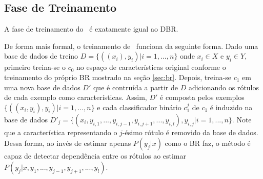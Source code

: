   
  
  
  

 
 
 \subsection{Fase de Treinamento}
  A fase de treinamento do \MRLMa~é exatamente igual ao DBR.
   
  
  
  De forma mais formal, o treinamento de \MRLM~funciona da seguinte forma.
  Dado uma base de dados de treino $D=\{((x_i),y_i)|i=1,...,n\}$ onde $x_i \in X$ e $y_i \in Y$,
  primeiro treina-se o $c_0$
  no espaço de características original conforme o treinamento do próprio BR mostrado na seção \ref{sec:br}.
  Depois, treina-se $c_1$ em uma nova base de dados $D'$ que é contruída a partir de $D$ adicionando os rótulos de cada
  exemplo como características. Assim, $D'$ é composta pelos exemplos $\{((x_i,y_i),y_i) |i=1,...,n\}$ e
  cada classificador binário $c_1^j$ de $c_1$ é induzido na base de dados $D'_j=\{(x_i,y_{i,1},...,y_{i,j-1},y_{i,j+1},...,y_{i,l}),y_{i,j} | i=1,...,n\}$.
  Note que a característica representando o $j$-ésimo rótulo é removido da base de dados.
  Dessa forma, ao invés de estimar apenas $P(y_j|x)$ como o BR faz, o método é capaz de detectar dependência entre os rótulos ao
  estimar $P(y_j|x,y_1,...,y_{j-1},y_{j+1},...,y_l)$.
  
